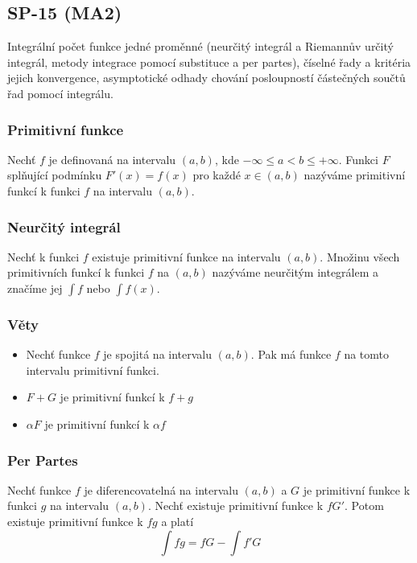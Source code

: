 \subsection{SP-15 (MA2)}
Integrální počet funkce jedné proměnné (neurčitý integrál a Riemannův určitý integrál, metody integrace pomocí substituce a per partes), číselné řady a kritéria jejich konvergence, asymptotické odhady chování posloupností částečných součtů řad pomocí integrálu.

\subsubsection*{Primitivní funkce}
Nechť $f$ je definovaná na intervalu $(a, b)$, kde $-\infty \leq a < b \leq +\infty$. Funkci $F$ splňující podmínku $F'(x) = f(x)$ pro každé $x \in (a, b)$ nazýváme primitivní funkcí k funkci $f$ na intervalu $(a, b)$.

\subsubsection*{Neurčitý integrál}
Nechť k funkci $f$ existuje primitivní funkce na intervalu $(a, b)$. Množinu všech primitivních funkcí k funkci $f$ na $(a, b)$ nazýváme neurčitým integrálem a značíme jej $\int f$ nebo $\int f(x)$.

\subsubsection*{Věty}
\begin{itemize}
    \item Nechť funkce $f$ je spojitá na intervalu $(a, b)$. Pak má funkce $f$ na tomto intervalu primitivní funkci.
    \item $F + G$ je primitivní funkcí k $f + g$
    \item $\alpha F$ je primitivní funkcí k $\alpha f$
\end{itemize}

\subsubsection*{Per Partes}
Nechť funkce $f$ je diferencovatelná na intervalu $(a, b)$ a $G$ je primitivní funkce k funkci $g$ na intervalu $(a, b)$. Nechť existuje primitivní funkce k $fG'$. Potom existuje primitivní funkce k $fg$ a platí $$\int fg = fG - \int f'G$$


